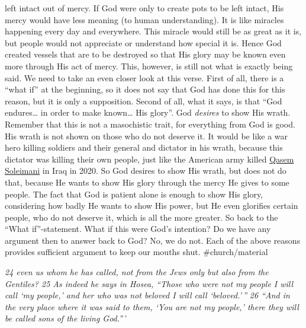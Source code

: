 left intact out of mercy. If God were only to create pots to be left
intact, His mercy would have less meaning (to human understanding). It
is like miracles happening every day and everywhere. This miracle would
still be as great as it is, but people would not appreciate or
understand how special it is. Hence God created vessels that are to be
destroyed so that His glory may be known even more through His act of
mercy. This, however, is still not what is exactly being said. We need
to take an even closer look at this verse. First of all, there is a
``what if'' at the beginning, so it does not say that God has done this
for this reason, but it is only a supposition. Second of all, what it
says, is that ``God endures\ldots{} in order to make known\ldots{} His
glory''. God \emph{desires} to show His wrath. Remember that this is not
a masochistic trait, for everything from God is good. His wrath is not
shown on those who do not deserve it. It would be like a war hero
killing soldiers and their general and dictator in his wrath, because
this dictator was killing their own people, just like the American army
killed \href{https://en.wikipedia.org/wiki/Qasem_Soleimani}{Qasem
Soleimani} in Iraq in 2020. So God desires to show His wrath, but does
not do that, because He wants to show His glory through the mercy He
gives to some people. The fact that God is patient alone is enough to
show His glory, considering how badly He wants to show His power, but He
even glorifies certain people, who do not deserve it, which is all the
more greater. So back to the ``What if''-statement. What if this were
God's intention? Do we have any argument then to answer back to God? No,
we do not. Each of the above reasons provides sufficient argument to
keep our mouths shut. \#church/material

\emph{24 even us whom he has called, not from the Jews only but also
from the Gentiles? 25 As indeed he says in Hosea,} \emph{``Those who
were not my people I will call `my people,'\emph{ }and her who was not
beloved I will call `beloved.'\,''} \emph{26 ``And in the very place
where it was said to them, `You are not my people,'\emph{ }there they
will be called sons of the living God.'''}


